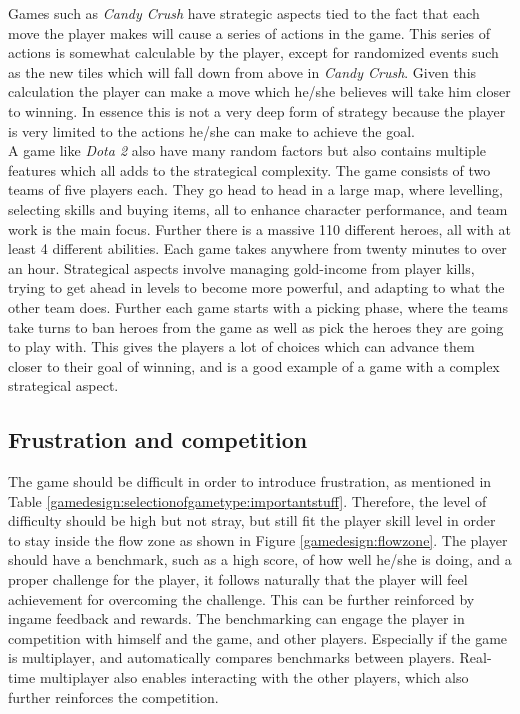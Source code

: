 Games such as \textit{Candy Crush}\cite{candycrush} have strategic aspects tied to the fact that each move the player makes will cause a series of actions in the game.
This series of actions is somewhat calculable by the player, except for randomized events such as the new tiles which will fall down from above in \textit{Candy Crush}.
Given this calculation the player can make a move which he/she believes will take him closer to winning.
In essence this is not a very deep form of strategy because the player is very limited to the actions he/she can make to achieve the goal.\\
A game like \textit{Dota 2}\cite{Dota2} also have many random factors but also contains multiple features which all adds to the strategical complexity.
The game consists of two teams of five players each. 
They go head to head in a large map, where levelling, selecting skills and buying items, all to enhance character performance, and team work is the main focus. 
Further there is a massive 110 different heroes, all with at least 4 different abilities. 
Each game takes anywhere from twenty minutes to over an hour. 
Strategical aspects involve managing gold-income from player kills, trying to get ahead in levels to become more powerful, and adapting to what the other team does. 
Further each game starts with a picking phase, where the teams take turns to ban heroes from the game as well as pick the heroes they are going to play with.
This gives the players a lot of choices which can advance them closer to their goal of winning, and is a good example of a game with a complex strategical aspect.

\subsection{Frustration and competition}
The game should be difficult in order to introduce frustration, as mentioned in Table \ref{gamedesign:selectionofgametype:importantstuff}.
Therefore, the level of difficulty should be high but not stray, but still fit the player skill level in order to stay inside the flow zone as shown in Figure \ref{gamedesign:flowzone}.
The player should have a benchmark, such as a high score, of how well he/she is doing, and a proper challenge for the player, it follows naturally that the player will feel achievement for overcoming the challenge.
This can be further reinforced by ingame feedback and rewards.
The benchmarking can engage the player in competition with himself and the game, and other players.
Especially if the game is multiplayer, and automatically compares benchmarks between players.
Real-time multiplayer also enables interacting with the other players, which also further reinforces the competition.


